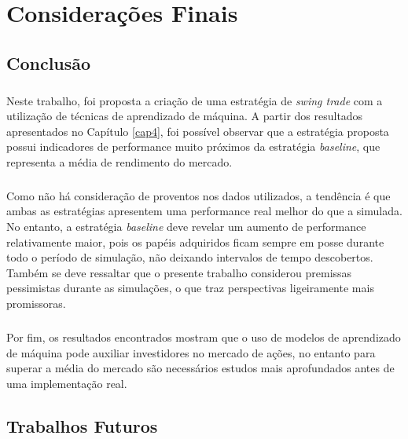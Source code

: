 \chapter{Considerações Finais}
\label{cap5}



\FloatBarrier
\section{Conclusão}



\paragraph{} Neste trabalho, foi proposta a criação de uma estratégia de \textit{swing trade} com a utilização de técnicas de aprendizado de máquina. A partir dos resultados apresentados no Capítulo \ref{cap4}, foi possível observar que a estratégia proposta possui indicadores de performance muito próximos da estratégia \textit{baseline}, que representa a média de rendimento do mercado.

\paragraph{} Como não há consideração de proventos nos dados utilizados, a tendência é que ambas as estratégias apresentem uma performance real melhor do que a simulada. No entanto, a estratégia \textit{baseline} deve revelar um aumento de performance relativamente maior, pois os papéis adquiridos ficam sempre em posse durante todo o período de simulação, não deixando intervalos de tempo descobertos. Também se deve ressaltar que o presente trabalho considerou premissas pessimistas durante as simulações, o que traz perspectivas ligeiramente mais promissoras.

\paragraph{} Por fim, os resultados encontrados mostram que o uso de modelos de aprendizado de máquina pode auxiliar investidores no mercado de ações, no entanto para superar a média do mercado são necessários estudos mais aprofundados antes de uma implementação real.



\FloatBarrier
\section{Trabalhos Futuros}



